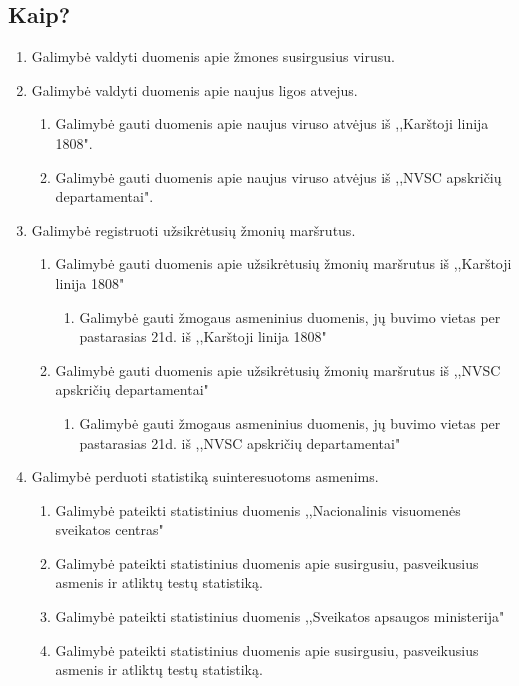 \documentclass{VUMIFPSkursinis}
\begin{document}
\subsection{Kaip?}
	\begin{enumerate}
		\item{Galimybė valdyti duomenis apie žmones susirgusius virusu.}
		\item{Galimybė valdyti duomenis apie naujus ligos atvejus.}
			\begin{enumerate}
				\item{Galimybė gauti duomenis apie naujus viruso atvėjus iš ,,Karštoji linija 1808".}
				\item{Galimybė gauti duomenis apie naujus viruso atvėjus iš ,,NVSC apskričių departamentai".}
			\end{enumerate}
		\item{Galimybė registruoti užsikrėtusių žmonių maršrutus.}
			\begin{enumerate}
				\item{Galimybė gauti duomenis apie užsikrėtusių žmonių maršrutus iš ,,Karštoji linija 1808"}
					\begin{enumerate}
						\item{Galimybė gauti žmogaus asmeninius duomenis, jų buvimo vietas per pastarasias 21d. iš ,,Karštoji linija 1808" }
					\end{enumerate}
				\item{Galimybė gauti duomenis apie užsikrėtusių žmonių maršrutus iš ,,NVSC apskričių departamentai"}
					\begin{enumerate}
						\item{Galimybė gauti žmogaus asmeninius duomenis, jų buvimo vietas per pastarasias 21d. iš ,,NVSC apskričių departamentai" }
					\end{enumerate}
			\end{enumerate}
		\item{Galimybė perduoti statistiką suinteresuotoms asmenims.}
			\begin{enumerate}
				\item{Galimybė pateikti statistinius duomenis ,,Nacionalinis visuomenės sveikatos centras"}
					\item{Galimybė pateikti statistinius duomenis apie susirgusiu, pasveikusius asmenis ir atliktų testų statistiką.}
				\item{Galimybė pateikti statistinius duomenis ,,Sveikatos apsaugos ministerija"}
					\item{Galimybė pateikti statistinius duomenis apie susirgusiu, pasveikusius asmenis ir atliktų testų statistiką.}

\end{enumerate}
\end{enumerate}
\end{document}
